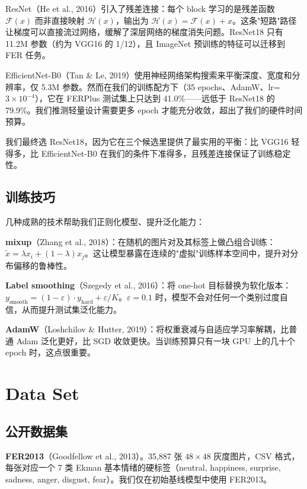\documentclass[12pt,a4paper]{ctexart}
\begin{document}
ResNet（He et al., 2016）引入了残差连接：每个 block 学习的是残差函数 $\mathcal{F}(x)$ 而非直接映射 $\mathcal{H}(x)$，输出为 $\mathcal{H}(x) = \mathcal{F}(x) + x$。这条"短路"路径让梯度可以直接流过网络，缓解了深层网络的梯度消失问题。ResNet18 只有 11.2M 参数（约为 VGG16 的 1/12），且 ImageNet 预训练的特征可以迁移到 FER 任务。

EfficientNet-B0（Tan \& Le, 2019）使用神经网络架构搜索来平衡深度、宽度和分辨率，仅 5.3M 参数。然而在我们的训练配方下（35 epochs、AdamW、lr=$3\times10^{-4}$），它在 FERPlus 测试集上只达到 41.0\%——远低于 ResNet18 的 79.9\%。我们推测轻量设计需要更多 epoch 才能充分收敛，超出了我们的硬件时间预算。

我们最终选 ResNet18，因为它在三个候选里提供了最实用的平衡：比 VGG16 轻得多，比 EfficientNet-B0 在我们的条件下准得多，且残差连接保证了训练稳定性。

\subsection{训练技巧}

几种成熟的技术帮助我们正则化模型、提升泛化能力：

\textbf{mixup}（Zhang et al., 2018）：在随机的图片对及其标签上做凸组合训练：$\tilde{x} = \lambda x_i + (1-\lambda) x_j$。这让模型暴露在连续的"虚拟"训练样本空间中，提升对分布偏移的鲁棒性。

\textbf{Label smoothing}（Szegedy et al., 2016）：将 one-hot 目标替换为软化版本：$y_{\text{smooth}} = (1-\varepsilon) \cdot y_{\text{hard}} + \varepsilon/K$。$\varepsilon=0.1$ 时，模型不会对任何一个类别过度自信，从而提升测试集泛化能力。

\textbf{AdamW}（Loshchilov \& Hutter, 2019）：将权重衰减与自适应学习率解耦，比普通 Adam 泛化更好，比 SGD 收敛更快。当训练预算只有一块 GPU 上的几十个 epoch 时，这点很重要。

\section{Data Set}

\subsection{公开数据集}

\textbf{FER2013}（Goodfellow et al., 2013）。35,887 张 $48\times48$ 灰度图片，CSV 格式，每张对应一个 7 类 Ekman 基本情绪的硬标签（neutral, happiness, surprise, sadness, anger, disgust, fear）。我们仅在初始基线模型中使用 FER2013。
\end{document}
